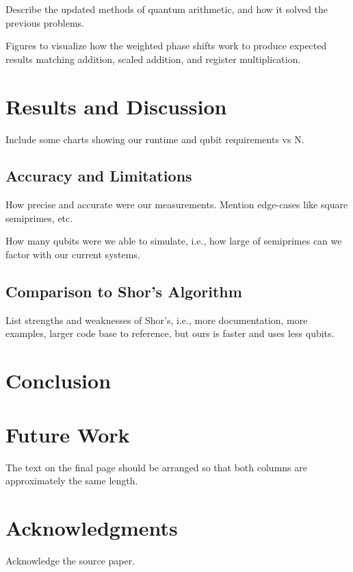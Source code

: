 \documentclass[twocolumn]{cinc}
\begin{document}
  Describe the updated methods of quantum arithmetic, and how it solved the 
  previous problems.

  Figures to visualize how the weighted phase shifts work to produce
  expected results matching addition, scaled addition, and register 
  multiplication.

\section{Results and Discussion}

Include some charts showing our runtime and qubit requirements vs N.

  \subsection{Accuracy and Limitations}

  How precise and accurate were our measurements. Mention edge-cases like
  square semiprimes, etc.

  How many qubits were we able to simulate, i.e., how large of semiprimes
  can we factor with our current systems.

  \subsection{Comparison to Shor's Algorithm}

  List strengths and weaknesses of Shor's, i.e., more documentation, more
  examples, larger code base to reference, but ours is faster and uses less
  qubits.

\section{Conclusion}



\section{Future Work}
 
The text on the final page should be arranged so that both columns are
approximately the same length.

\balance

\section*{Acknowledgments}  
% 
Acknowledge the source paper.
\end{document}
